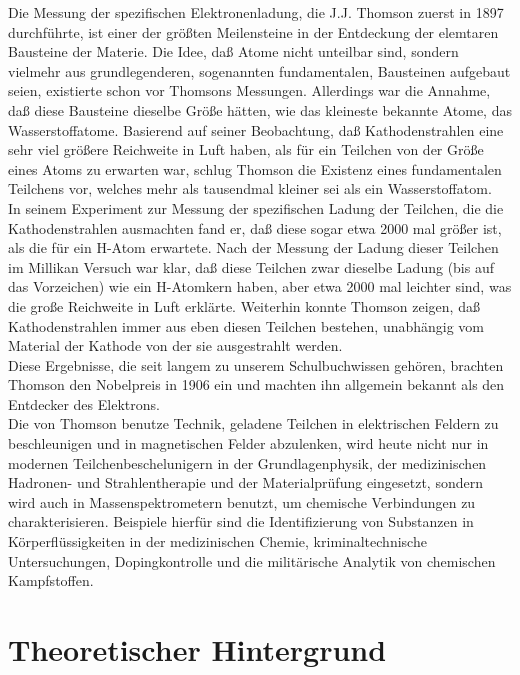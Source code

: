 Die Messung der spezifischen Elektronenladung, die J.J. Thomson zuerst in 1897 durchführte, ist einer der größten Meilensteine in der Entdeckung der elemtaren Bausteine der Materie. Die Idee, daß Atome nicht unteilbar sind, sondern vielmehr aus grundlegenderen, sogenannten fundamentalen, Bausteinen aufgebaut seien, existierte schon vor Thomsons Messungen. Allerdings war die Annahme, daß diese Bausteine dieselbe Größe hätten, wie das kleineste bekannte Atome, das Wasserstoffatome. Basierend auf seiner Beobachtung, daß Kathodenstrahlen eine sehr viel größere Reichweite in Luft haben, als für ein Teilchen von der Größe eines Atoms zu erwarten war, schlug Thomson die Existenz eines fundamentalen Teilchens vor, welches mehr als tausendmal kleiner sei als ein Wasserstoffatom.\\
In seinem Experiment zur Messung der spezifischen Ladung der Teilchen, die die Kathodenstrahlen ausmachten fand er, daß diese sogar etwa 2000 mal größer ist, als die für ein H-Atom erwartete. Nach der Messung der Ladung dieser Teilchen im Millikan Versuch war klar, daß diese Teilchen zwar dieselbe Ladung (bis auf das Vorzeichen) wie ein H-Atomkern haben, aber etwa 2000 mal leichter sind, was die große Reichweite in Luft erklärte. Weiterhin konnte Thomson zeigen, daß Kathodenstrahlen immer aus eben diesen Teilchen bestehen, unabhängig vom Material der Kathode von der sie ausgestrahlt werden.\\
Diese Ergebnisse, die seit langem zu unserem Schulbuchwissen gehören, brachten Thomson den Nobelpreis in 1906 ein und machten ihn allgemein bekannt als den Entdecker des Elektrons.\\

\noindent
Die von Thomson benutze Technik, geladene Teilchen in elektrischen Feldern zu beschleunigen und in magnetischen Felder abzulenken, wird heute nicht nur in modernen Teilchenbeschelunigern in der Grundlagenphysik, der medizinischen Hadronen- und Strahlentherapie und der Materialprüfung eingesetzt, sondern wird auch in Massenspektrometern benutzt, um chemische Verbindungen zu charakterisieren. Beispiele hierfür sind die Identifizierung von Substanzen in Körperflüssigkeiten in der medizinischen Chemie, kriminaltechnische Untersuchungen, Dopingkontrolle und die militärische Analytik von chemischen Kampfstoffen.

\section{Theoretischer Hintergrund}

